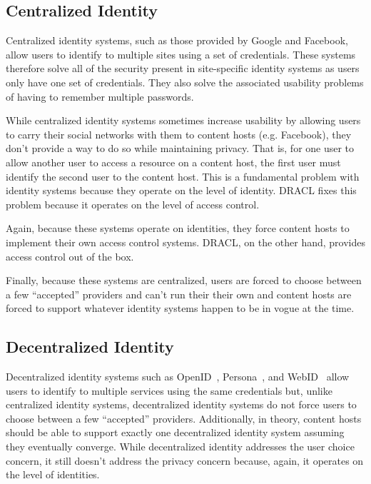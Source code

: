 \documentclass[pdftex,12pt,a4papaer]{report}
\begin{document}
\subsection{Centralized Identity}

Centralized identity systems, such as those provided by Google and Facebook,
allow users to identify to multiple sites using a set of credentials. These
systems therefore solve all of the security present in site-specific identity
systems as users only have one set of credentials. They also solve the
associated usability problems of having to remember multiple passwords.

While centralized identity systems sometimes increase usability by allowing
users to carry their social networks with them to content hosts (e.g. Facebook),
they don't provide a way to do so while maintaining privacy. That is, for one
user to allow another user to access a resource on a content host, the first
user must identify the second user to the content host. This is a fundamental
problem with identity systems because they operate on the level of identity.
DRACL fixes this problem because it operates on the level of access control.

Again, because these systems operate on identities, they force content hosts to
implement their own access control systems. DRACL, on the other hand, provides
access control out of the box.

Finally, because these systems are centralized, users are forced to choose
between a few ``accepted'' providers and can't run their their own and content
hosts are forced to support whatever identity systems happen to be in vogue at
the time.

\subsection{Decentralized Identity}

Decentralized identity systems such as OpenID~\cite{openid},
Persona~\cite{persona}, and WebID~\cite{webid} allow users to identify to
multiple services using the same credentials but, unlike centralized identity
systems, decentralized identity systems do not force users to choose
between a few ``accepted'' providers. Additionally, in theory, content hosts
should be able to support exactly one decentralized identity system assuming
they eventually converge. While decentralized identity addresses the user choice
concern, it still doesn't address the privacy concern because, again, it
operates on the level of identities.
\end{document}
